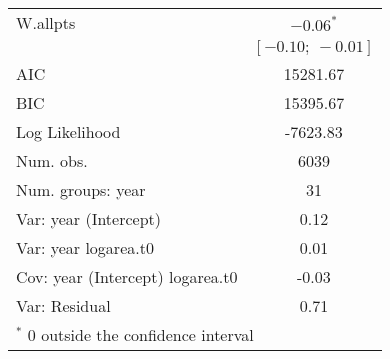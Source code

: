 \documentclass[11pt]{article}
\begin{document}
\begin{table}
\begin{center}
\begin{tabular}{l c }
W.allpts                         & $-0.06^{*}$       \\
                                 & $[-0.10;\ -0.01]$ \\
\hline
AIC                              & 15281.67          \\
BIC                              & 15395.67          \\
Log Likelihood                   & -7623.83          \\
Num. obs.                        & 6039              \\
Num. groups: year                & 31                \\
Var: year (Intercept)            & 0.12              \\
Var: year logarea.t0             & 0.01              \\
Cov: year (Intercept) logarea.t0 & -0.03             \\
Var: Residual                    & 0.71              \\
\hline
\multicolumn{2}{l}{\scriptsize{$^*$ 0 outside the confidence interval}}
\end{tabular}
\label{table:PSSPgrowth-byYr}
\end{center}
\end{table}
\end{document}
